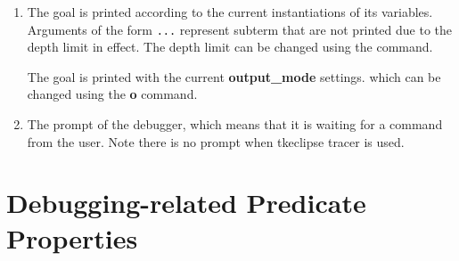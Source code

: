 \begin{enumerate}
\item The goal is printed according to the current instantiations
of its variables.  Arguments of the form {\tt ...} represent subterm
that are not printed due to the depth limit in effect.
The depth limit can be changed using the
{\bf {\lt}} command.

The goal is printed with the current {\bf output_mode} settings.
which can be changed using the
{\bf o} command.

\item The prompt of the debugger, which means that it is waiting
for a command from the user. Note there is no prompt when tkeclipse tracer
is used.
\end{enumerate}

\section{Debugging-related Predicate Properties}

